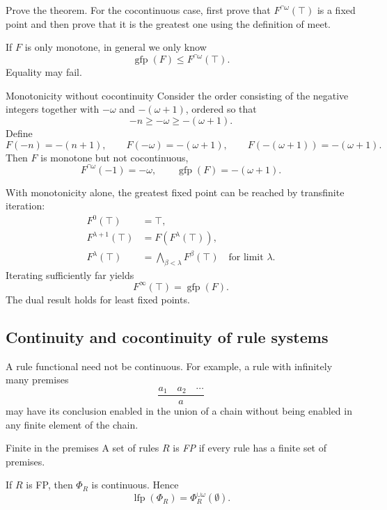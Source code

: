 \documentclass[a4paper]{article}
\newcommand{\lfp}{\operatorname{lfp}}
\newcommand{\gfp}{\operatorname{gfp}}
\begin{document}
\begin{snippetexercise}{}
    Prove the theorem. For the cocontinuous case, first prove that \(F^{\cap\omega}(\top)\) is a fixed point and then prove that it is the greatest one using the definition of meet.
\end{snippetexercise}

If \(F\) is only monotone, in general we only know
\[
    \gfp(F)\leq F^{\cap\omega}(\top).
\]
Equality may fail.

\begin{snippetexample}{Monotonicity without cocontinuity}
    Consider the order consisting of the negative integers together with \(-\omega\) and \(-(\omega+1)\), ordered so that
    \[
        -n\geq-\omega\geq-(\omega+1).
    \]
    Define
    \[
        F(-n)=-(n+1),
        \qquad
        F(-\omega)=-(\omega+1),
        \qquad
        F(-(\omega+1))=-(\omega+1).
    \]
    Then \(F\) is monotone but not cocontinuous,
    \[
        F^{\cap\omega}(-1)=-\omega,
        \qquad
        \gfp(F)=-(\omega+1).
    \]
\end{snippetexample}

With monotonicity alone, the greatest fixed point can be reached by transfinite iteration:
\begin{align*}
    F^0(\top)&=\top,\\
    F^{\lambda+1}(\top)&=F(F^\lambda(\top)),\\
    F^\lambda(\top)&=\bigwedge_{\beta<\lambda}F^\beta(\top)
    \quad\text{for limit \(\lambda\)}.
\end{align*}
Iterating sufficiently far yields
\[
    F^\infty(\top)=\gfp(F).
\]
The dual result holds for least fixed points.

\subsection{Continuity and cocontinuity of rule systems}

A rule functional need not be continuous.
For example, a rule with infinitely many premises
\[
    \frac{a_1\quad a_2\quad\cdots}{a}
\]
may have its conclusion enabled in the union of a chain without being enabled in any finite element of the chain.

\begin{snippetdefinition}{Finite in the premises}
    A set of rules \(R\) is \emph{FP} if every rule has a finite set of premises.
\end{snippetdefinition}

\begin{snippetproposition}{}
    If \(R\) is FP, then \(\Phi_R\) is continuous. Hence
    \[
        \lfp(\Phi_R)
        =
        \Phi_R^{\cup\omega}(\emptyset).
    \]
\end{snippetproposition}
\end{document}
